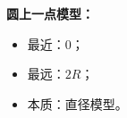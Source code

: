 \begin{summarybox}
\textbf{圆上一点模型：}

\begin{itemize}
  \item 最近：$0$；
  \item 最远：$2R$；
  \item 本质：直径模型。
\end{itemize}
\end{summarybox}

